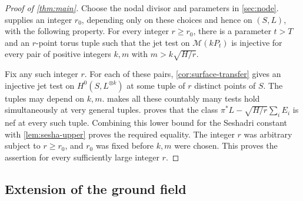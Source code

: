\begin{proof}[Proof of \cref{thm:main}]
Choose the nodal divisor and parameters in \cref{sec:node}.  supplies an integer $r_0$, depending only on these choices and hence on $(S,L)$, with the following property. For every integer $r\ge r_0$, there is a parameter $t>T$ and an $r$-point torus tuple such that the jet test on $\mathcal{M}(kP_t)$ is injective for every pair of positive integers $k,m$ with $m>k\sqrt{H/r}$.

Fix any such integer $r$. For each of these pairs, \cref{cor:surface-transfer} gives an injective jet test on $H^0(S,L^{\otimes k})$ at some tuple of $r$ distinct points of $S$. The tuples may depend on $k,m$.  makes all these countably many tests hold simultaneously at very general tuples.  proves that the class $\pi^*L-\sqrt{H/r}\sum_iE_i$ is nef at every such tuple. Combining this lower bound for the Seshadri constant with \cref{lem:sesha-upper} proves the required equality. The integer $r$ was arbitrary subject to $r\ge r_0$, and $r_0$ was fixed before $k,m$ were chosen. This proves the assertion for every sufficiently large integer $r$.
\end{proof}

\subsection{Extension of the ground field}

